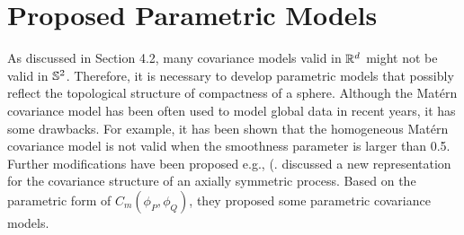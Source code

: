 \vskip 16pt
				
\section{Proposed Parametric Models}

As discussed in Section 4.2, many covariance models valid in $\mathbb{R}^d$ might not be valid in $\mathbb{S}^2$. Therefore, it is necessary to develop parametric models that possibly reflect the topological structure of compactness of a sphere. Although the Mat\'{e}rn covariance model has been often used to model global data in recent years, it has some drawbacks. For example, it has been shown that the homogeneous Mat\'{e}rn covariance model is not valid when the smoothness parameter is larger than 0.5. Further modifications have been proposed e.g., (\citealp{Li2013, JunStein2008, JeongJun2015}. \cite{Huang2012} discussed a new representation for the covariance structure of an axially symmetric process. Based on the parametric form of $C_m(\phi_P, \phi_Q)$, they proposed some parametric covariance models.
					
